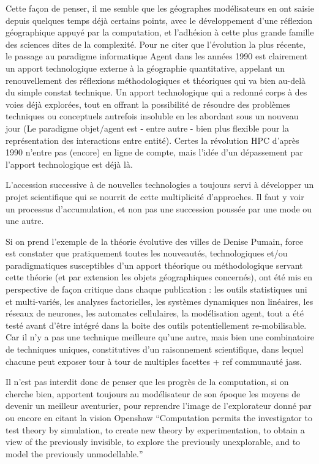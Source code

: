 Cette façon de penser, il me semble que les géographes modélisateurs en ont saisie depuis quelques temps déjà certains points, avec le développement d'une réflexion géographique appuyé par la computation, et l'adhésion à cette plus grande famille des sciences dites de la complexité. Pour ne citer que l'évolution la plus récente, le passage au paradigme informatique Agent dans les années 1990 est clairement un apport technologique externe à la géographie quantitative, appelant un renouvellement des réflexions méthodologiques et théoriques \autocite{Sanders2006} qui va bien au-delà du simple constat technique. Un apport technologique qui a redonné corps à des voies déjà explorées, tout en offrant la possibilité de résoudre des problèmes techniques ou conceptuels autrefois insoluble en les abordant sous un nouveau jour (Le paradigme objet/agent est - entre autre - bien plus flexible pour la représentation des interactions entre entité). Certes la révolution HPC d'après 1990 n'entre pas (encore) en ligne de compte, mais l'idée d'un dépassement par l'apport technologique est déjà là.

L'accession successive à de nouvelles technologies a toujours servi à développer un projet scientifique qui se nourrit de cette multiplicité d'approches. Il faut y voir un processus d'accumulation, et non pas une succession poussée par une mode ou une autre.

Si on prend l'exemple de la théorie évolutive des villes de Denise Pumain, force est constater que pratiquement toutes les nouveautés, technologiques et/ou paradigmatiques susceptibles d'un apport théorique ou méthodologique servant cette théorie (et par extension les objets géographiques concernés), ont été mis en perspective de façon critique dans chaque publication : les outils statistiques uni et multi-variés, les analyses factorielles, les systèmes dynamiques non linéaires, les réseaux de neurones, les automates cellulaires, la modélisation agent, tout a été testé avant d'être intégré dans la boite des outils potentiellement re-mobilisable. Car il n'y a pas une technique meilleure qu'une autre, mais bien une combinatoire de techniques uniques, constitutives d'un raisonnement scientifique, dans lequel chacune peut exposer tour à tour de multiples facettes  + ref communauté jass.

Il n'est pas interdit donc de penser que les progrès de la computation, si on cherche bien, apportent toujours au modélisateur de son époque les moyens de devenir un meilleur aventurier, pour reprendre l'image de l'explorateur donné par \textcite[22]{Banos2013} ou encore en citant la vision Openshaw \foreignquote{english}{Computation permits the investigator to test theory by simulation, to create new theory by experimentation, to obtain a view of the previously invisible, to explore the previously unexplorable, and to model the previously unmodellable.}

